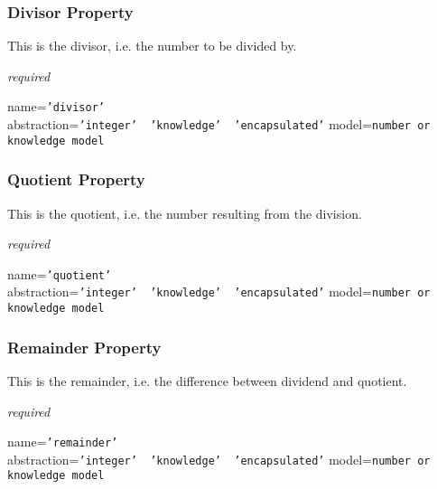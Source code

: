 \subsubsection{Divisor Property}

This is the divisor, i.e. the number to be divided by.

\emph{required}

name=\texttt{'divisor'}\\
abstraction=\texttt{'integer' \vline\ 'knowledge' \vline\ 'encapsulated'}
model=\texttt{number or knowledge model}

\subsubsection{Quotient Property}

This is the quotient, i.e. the number resulting from the division.

\emph{required}

name=\texttt{'quotient'}\\
abstraction=\texttt{'integer' \vline\ 'knowledge' \vline\ 'encapsulated'}
model=\texttt{number or knowledge model}

\subsubsection{Remainder Property}

This is the remainder, i.e. the difference between dividend and quotient.

\emph{required}

name=\texttt{'remainder'}\\
abstraction=\texttt{'integer' \vline\ 'knowledge' \vline\ 'encapsulated'}
model=\texttt{number or knowledge model}
